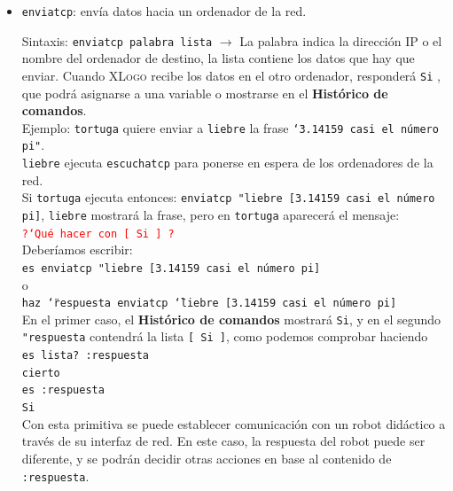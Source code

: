 \begin{itemize}
      Ejemplo: \texttt{liebre} quiere hablar con \texttt{tortuga}. \\
      \texttt{tortuga} ejecuta \texttt{escuchatcp} para ponerse en espera de
      los ordenadores de la red. \texttt{liebre} ejecuta entonces:
      \texttt{chattcp "192.168.1.2 [buenos d\'ias]}.\\
      Una ventana se abre en cada uno de los ordenadores para permitir la
      conversaci\'on 
   \item \texttt{enviatcp}:  env\'ia datos
      hacia un ordenador de la red.

      Sintaxis: \texttt{enviatcp palabra lista} $\rightarrow$ La palabra indica
      la direcci\'on IP o el nombre del ordenador de destino, la lista
      contiene los datos que hay que enviar. Cuando \textsc{XLogo} recibe
      los datos en el otro ordenador, responder\'a \texttt{Si} , que podr\'a
      asignarse a una variable o mostrarse en el \textbf{Hist\'orico de
      comandos}.\\ 

      Ejemplo: \texttt{tortuga} quiere enviar a \texttt{liebre} la frase
      \texttt{\char`\"{}3.14159 casi el n\'umero pi"}. \\
      \texttt{liebre} ejecuta \texttt{escuchatcp} para ponerse en espera de
      los ordenadores de la red. \\
      Si \texttt{tortuga} ejecuta entonces:
      \texttt{enviatcp "liebre [3.14159 casi el n\'umero pi]}, \texttt{liebre}
      mostrar\'a la frase, pero en \texttt{tortuga} aparecer\'a el mensaje:\\
      \textcolor{red}{\texttt{?`Qu\'e hacer con  [ Si ]  ?}}\\
      Deber\'iamos escribir: \\
      \texttt{es enviatcp "liebre [3.14159 casi el n\'umero pi]} \\
      o \\
      \texttt{haz \char`\"{}respuesta enviatcp \char`\"{}liebre [3.14159 casi el 
            n\'umero pi]}\\
      En el primer caso, el \textbf{Hist\'orico de comandos} mostrar\'a
      \texttt{Si}, y en el segundo \verb+"respuesta+ contendr\'a la lista 
      \texttt{[ Si ]}, como podemos comprobar haciendo\\
      \texttt{es lista? :respuesta} \\
      \texttt{cierto} \\
      \texttt{es :respuesta} \\
      \texttt{Si} \\

      Con esta primitiva se puede establecer comunicaci\'on con un robot
      did\'actico a trav\'es de su interfaz de red. En este caso, la respuesta
      del robot puede ser diferente, y se podr\'an decidir otras acciones en
      base al contenido de \texttt{:respuesta}.
\end{itemize}


